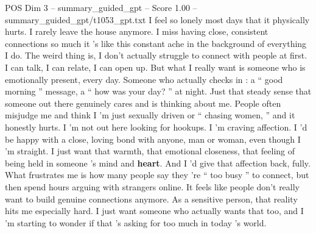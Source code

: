 \begin{textsample}{POS Dim 3 – summary\_guided\_gpt – Score 1.00 – summary\_guided\_gpt/t1053\_gpt.txt}  \label{ex:f3_pos_028}
I feel so lonely most days that it physically hurts.
I rarely leave the house anymore.
I miss having close, consistent connections so much it ’s like this constant ache in the background of everything I do.
The weird thing is, I don't actually struggle to connect with people at first.
I can talk, I can relate, I can open up.
But what I really want is someone who is emotionally present, every day.
Someone who actually checks in : a “ good morning ” message, a “ how was your day? ” at night.
Just that steady sense that someone out there genuinely cares and is thinking about me.
People often misjudge me and think I ’m just sexually driven or “ chasing women, ” and it honestly hurts.
I ’m not out here looking for hookups.
I ’m craving affection.
I ’d be happy with a close, loving bond with anyone, man or woman, even though I ’m straight.
I just want that warmth, that emotional closeness, that feeling of being held in someone ’s mind and \textbf{heart}.
And I ’d give that affection back, fully.
What frustrates me is how many people say they ’re “ too busy ” to connect, but then spend hours arguing with strangers online.
It feels like people don't really want to build genuine connections anymore.
As a sensitive person, that reality hits me especially hard.
I just want someone who actually wants that too, and I ’m starting to wonder if that ’s asking for too much in today ’s world.

\end{textsample}
